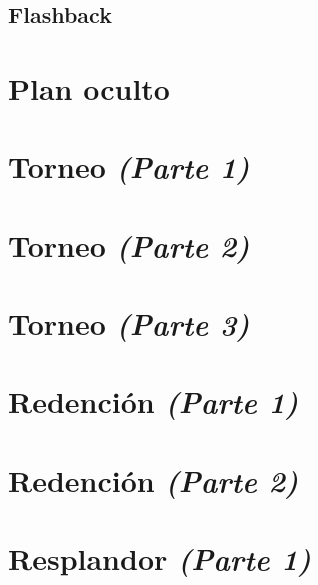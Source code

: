 \documentclass[11pt]{book}
\begin{document}
\begin{appendices}
\renewcommand{\thechapter}{\arabic{chapter}}
\chapter{Flashback}

\end{appendices}

\chapter{Plan oculto}


\chapter{Torneo \emph{\mdseries(Parte 1)}}


\chapter{Torneo \emph{\mdseries(Parte 2)}}


\chapter{Torneo \emph{\mdseries(Parte 3)}}


\chapter{Redención \emph{\mdseries(Parte 1)}}


\chapter{Redención \emph{\mdseries(Parte 2)}}


\chapter{Resplandor \emph{\mdseries(Parte 1)}}

\end{document}
